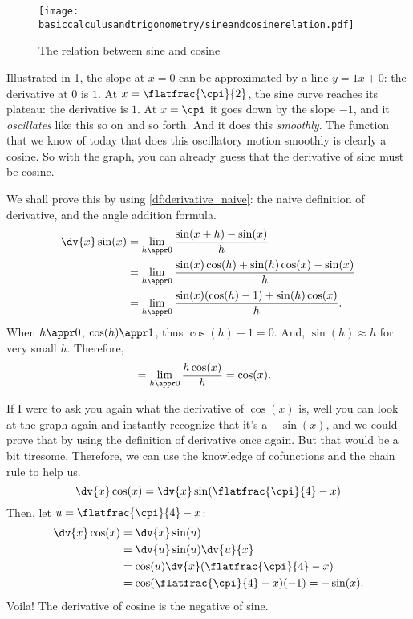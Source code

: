\begin{figure}[ht]
    \centering
    \texttt{[image: basiccalculusandtrigonometry/sineandcosinerelation.pdf]}
    \caption{The relation between sine and cosine}
    \label{fig:sineandcosinerelation}
\end{figure}

Illustrated in \cref{fig:sineandcosinerelation}, the slope at $x = 0$ can be approximated by a line $y = 1x + 0$: the derivative at $0$ is $1$. At $x = \flatfrac{\cpi}{2}$, the sine curve reaches its plateau: the derivative is $1$. At $x = \cpi$ it goes down by the slope $-1$, and it \emph{oscillates} like this so on and so forth. And it does this \emph{smoothly}. The function that we know of today that does this oscillatory motion smoothly is clearly a cosine. So with the graph, you can already guess that the derivative of sine must be cosine.

We shall prove this by using \cref{df:derivative_naive}: the naive definition of derivative, and the angle addition formula.
\begin{align*}
    \dv{x}\sin(x) &= \lim_{h \appr 0}\frac{\sin(x + h) - \sin(x)}{h} \\
    &= \lim_{h \appr 0}\frac{\sin(x)\cos(h) + \sin(h)\cos(x) - \sin(x)}{h} \\
    &= \lim_{h \appr 0}\frac{\sin(x)(\cos(h) - 1) + \sin(h)\cos(x)}{h}.
\end{align*}
When $h \appr 0$, $\cos(h) \appr 1$, thus $\cos(h) - 1 = 0$. And, $\sin(h) \approx h$ for very small $h$. Therefore,
\begin{align*}
    &= \lim_{h \appr 0}\frac{h\cos(x)}{h} = \cos(x).
\end{align*}

If I were to ask you again what the derivative of $\cos(x)$ is, well you can look at the graph again and instantly recognize that it's a $-\sin(x)$, and we could prove that by using the definition of derivative once again. But that would be a bit tiresome. Therefore, we can use the knowledge of cofunctions and the chain rule to help us.
\begin{equation}
    \dv{x}\cos(x) = \dv{x}\sin(\flatfrac{\cpi}{4} - x)
\end{equation}
Then, let $u = \flatfrac{\cpi}{4} - x$:
\begin{align*}
    \dv{x}\cos(x) &= \dv{x}\sin(u) \\
    &= \dv{u}\sin(u)\dv{u}{x} \\
    &= \cos(u)\dv{x}(\flatfrac{\cpi}{4} - x) \\
    &= \cos(\flatfrac{\cpi}{4} - x)(-1) = -\sin(x).
\end{align*}
Voila! The derivative of cosine is the negative of sine.

